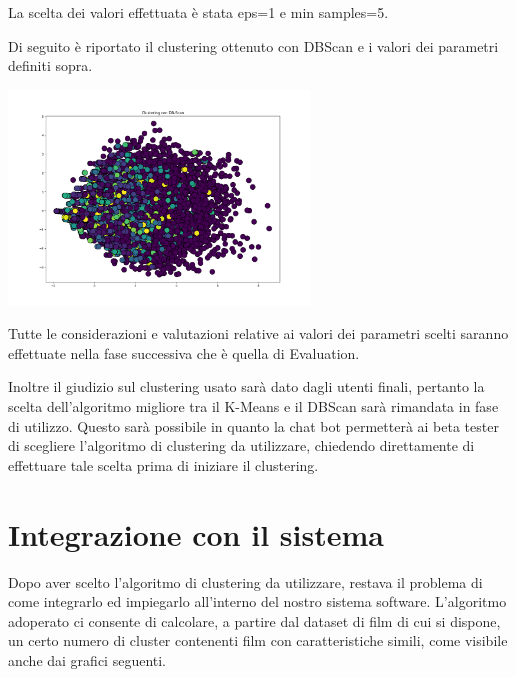 \documentclass[a4paper, 10pt]{report}
\begin{document}
            La scelta dei valori effettuata è stata eps=1 e min samples=5.

            Di seguito è riportato il clustering ottenuto con DBScan e i valori dei parametri definiti sopra.

            \begin{center}
                \includegraphics[width=8cm]{modelling/DBScan.png}\\
            \end{center}

            Tutte le considerazioni e valutazioni relative ai valori dei parametri scelti saranno effettuate nella fase successiva
            che è quella di Evaluation.

            Inoltre il giudizio sul clustering usato sarà dato dagli utenti finali, pertanto la scelta dell'algoritmo migliore tra
            il K-Means e il DBScan sarà rimandata in fase di utilizzo.
            Questo sarà possibile in quanto la chat bot permetterà ai beta tester di scegliere l'algoritmo di clustering
            da utilizzare, chiedendo direttamente di effettuare tale scelta prima di iniziare il clustering.


        \section{Integrazione con il sistema}\label{sec:integrazione-con-il-sistema}
            Dopo aver scelto l'algoritmo di clustering da utilizzare, restava il problema di come integrarlo ed impiegarlo all'interno
            del nostro sistema software.
            L'algoritmo adoperato ci consente di calcolare, a partire dal dataset di film di cui si dispone, un certo numero di cluster
            contenenti film con caratteristiche simili, come visibile anche dai grafici seguenti.
\end{document}
